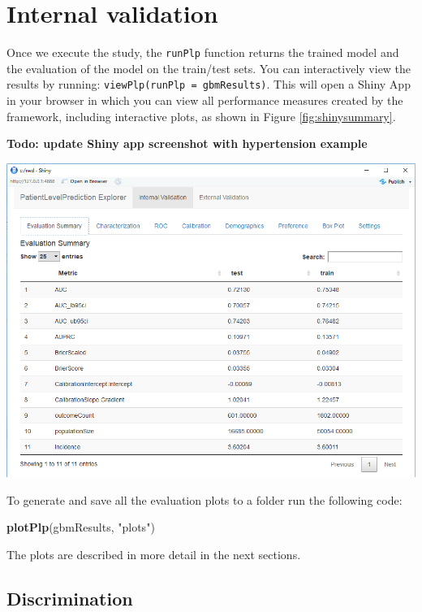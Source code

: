 \documentclass[11pt]{book}
\newenvironment{Shaded}{\begin{snugshade}}{\end{snugshade}}
\newcommand{\KeywordTok}[1]{\textcolor[rgb]{0.13,0.29,0.53}{\textbf{#1}}}
\newcommand{\StringTok}[1]{\textcolor[rgb]{0.31,0.60,0.02}{#1}}
\newcommand{\NormalTok}[1]{#1}
\begin{document}
\section{Internal validation}\label{internal-validation}

Once we execute the study, the \texttt{runPlp} function returns the
trained model and the evaluation of the model on the train/test sets.
You can interactively view the results by running:
\texttt{viewPlp(runPlp\ =\ gbmResults)}. This will open a Shiny App in
your browser in which you can view all performance measures created by
the framework, including interactive plots, as shown in Figure
\ref{fig:shinysummary}.

\textbf{Todo: update Shiny app screenshot with hypertension example}

\includegraphics[width=1\linewidth]{images/PatientLevelPrediction/shinysummary}

To generate and save all the evaluation plots to a folder run the
following code:

\begin{Shaded}
\begin{Highlighting}[]
\KeywordTok{plotPlp}\NormalTok{(gbmResults, }\StringTok{"plots"}\NormalTok{)}
\end{Highlighting}
\end{Shaded}

The plots are described in more detail in the next sections.

\subsection{Discrimination}\label{discrimination}
\end{document}
